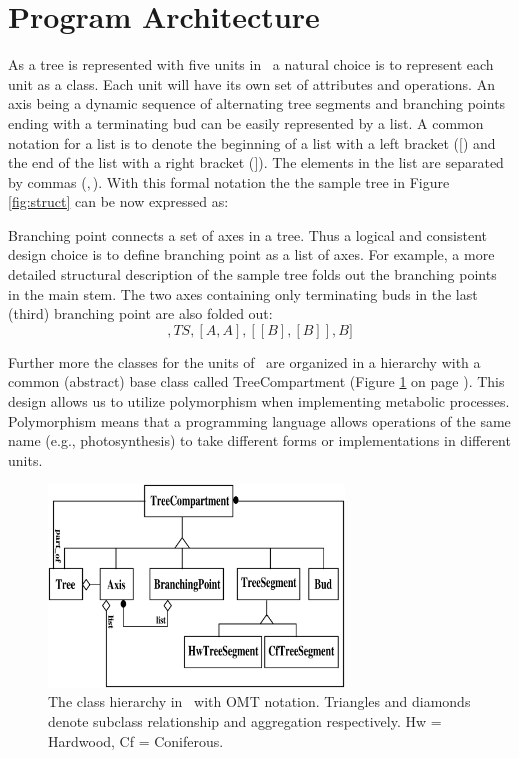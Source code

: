 \section{Program Architecture}

As a tree is represented with five units  in \lignum\ a natural choice
is to represent each unit as a class.  Each unit will have its own set
of attributes  and operations.  An axis  being  a dynamic  sequence of
alternating tree  segments   and  branching   points  ending  with   a
terminating  bud  can  be easily   represented by a   list.  A  common
notation for a list is  to denote the beginning  of a list with a left
bracket ($[$) and the end of the list with  a right bracket ($]$). The
elements in the list are separated by  commas ($,$).  With this formal
notation  the the  sample tree  in Figure \ref{fig:struct}  can be now
expressed as:
\begin{displaymath}
[TS,BP,TS,BP,TS,BP,B]
\end{displaymath}

Branching point connects a set of axes in a tree.   Thus a logical and
consistent design  choice is  to define branching  point  as a list of
axes.  For example, a   more detailed  structural description  of  the
sample tree  folds out the branching points  in the main stem. The two
axes containing only terminating   buds in the last (third)  branching
point are also folded out:
\begin{displaymath}
[TS,[A,A],TS,[A,A],[[B],[B]],B]
\end{displaymath}
 
Further more the classes for the units of \lignum\  are organized in a
hierarchy with a common (abstract)  base class called  TreeCompartment
(Figure \ref{fig:omt} on page  \pageref{fig:omt}).  This design allows
us to  utilize  polymorphism  when  implementing metabolic  processes.
Polymorphism means that  a  programming language allows operations  of
the   same name (e.g.,  photosynthesis)   to  take different forms  or
implementations in different units.

\begin{figure}[h]
\begin{center}
\includegraphics[width=0.7\textwidth,height=0.5\textwidth]{lignum-classes.eps}
\caption{\label{fig:omt} The class hierarchy in \lignum\ with OMT
notation. Triangles and diamonds denote subclass relationship and 
aggregation respectively. Hw = Hardwood, Cf = Coniferous.}
\end{center}
\end{figure}

